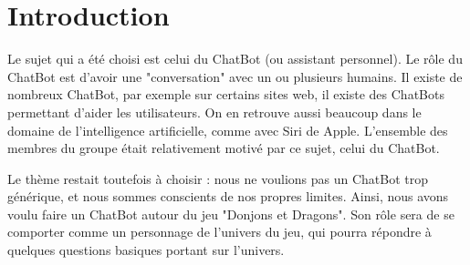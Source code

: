 	\section{Introduction}

Le sujet qui a été choisi est celui du ChatBot (ou assistant personnel). Le rôle du ChatBot est d'avoir une "conversation" avec un ou plusieurs humains. Il existe de nombreux ChatBot, par exemple sur certains sites web, il existe des ChatBots permettant d'aider les utilisateurs. On en retrouve aussi beaucoup dans le domaine de l'intelligence artificielle, comme avec Siri de Apple. L’ensemble des membres du groupe était relativement motivé par ce sujet, celui du ChatBot. 

Le thème restait toutefois à choisir : nous ne voulions pas un ChatBot trop générique, et nous sommes conscients de nos propres limites. Ainsi, nous avons voulu faire un ChatBot autour du jeu "Donjons et Dragons". Son rôle sera de se comporter comme un personnage de l'univers du jeu, qui pourra répondre à quelques questions basiques portant sur l'univers.